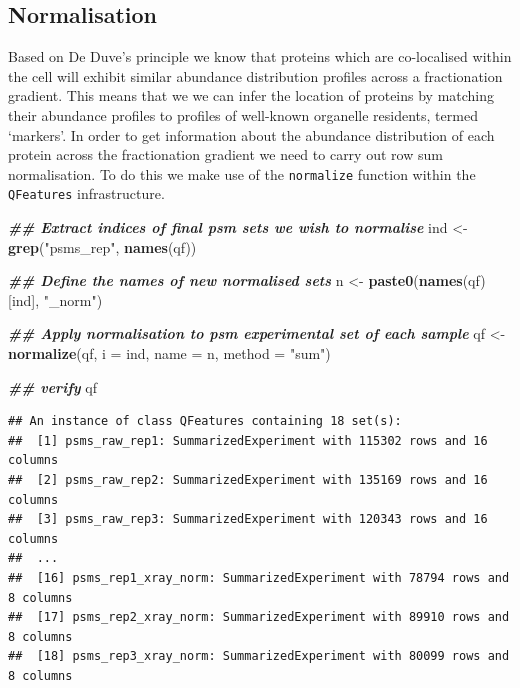 \documentclass[9pt,a4paper,]{extarticle}
\newenvironment{Shaded}{\begin{snugshade}}{\end{snugshade}}
\newcommand{\AttributeTok}[1]{\textcolor[rgb]{0.13,0.29,0.53}{#1}}
\newcommand{\DocumentationTok}[1]{\textcolor[rgb]{0.56,0.35,0.01}{\textbf{\textit{#1}}}}
\newcommand{\FunctionTok}[1]{\textcolor[rgb]{0.13,0.29,0.53}{\textbf{#1}}}
\newcommand{\NormalTok}[1]{#1}
\newcommand{\OtherTok}[1]{\textcolor[rgb]{0.56,0.35,0.01}{#1}}
\newcommand{\StringTok}[1]{\textcolor[rgb]{0.31,0.60,0.02}{#1}}
\begin{document}
\subsection{Normalisation}\label{normalisation}

Based on De Duve's principle \citep{deDuve1964} we know that proteins which are
co-localised within the cell will exhibit similar abundance distribution profiles
across a fractionation gradient. This means that we we can infer the location of
proteins by matching their abundance profiles to profiles of well-known organelle
residents, termed `markers'. In order to get information about the abundance
distribution of each protein across the fractionation gradient we need to carry
out row sum normalisation. To do this we make use of the \texttt{normalize} function
within the \texttt{QFeatures} infrastructure.

\begin{Shaded}
\begin{Highlighting}[]
\DocumentationTok{\#\# Extract indices of final psm sets we wish to normalise}
\NormalTok{ind }\OtherTok{\textless{}{-}} \FunctionTok{grep}\NormalTok{(}\StringTok{"psms\_rep"}\NormalTok{, }\FunctionTok{names}\NormalTok{(qf))}

\DocumentationTok{\#\# Define the names of new normalised sets}
\NormalTok{n }\OtherTok{\textless{}{-}} \FunctionTok{paste0}\NormalTok{(}\FunctionTok{names}\NormalTok{(qf)[ind], }\StringTok{"\_norm"}\NormalTok{)}

\DocumentationTok{\#\# Apply normalisation to psm experimental set of each sample}
\NormalTok{qf }\OtherTok{\textless{}{-}} \FunctionTok{normalize}\NormalTok{(qf, }
                \AttributeTok{i =}\NormalTok{ ind, }
                \AttributeTok{name =}\NormalTok{ n, }
                \AttributeTok{method =} \StringTok{"sum"}\NormalTok{)}

\DocumentationTok{\#\# verify}
\NormalTok{qf}
\end{Highlighting}
\end{Shaded}

\begin{verbatim}
## An instance of class QFeatures containing 18 set(s):
##  [1] psms_raw_rep1: SummarizedExperiment with 115302 rows and 16 columns 
##  [2] psms_raw_rep2: SummarizedExperiment with 135169 rows and 16 columns 
##  [3] psms_raw_rep3: SummarizedExperiment with 120343 rows and 16 columns 
##  ...
##  [16] psms_rep1_xray_norm: SummarizedExperiment with 78794 rows and 8 columns 
##  [17] psms_rep2_xray_norm: SummarizedExperiment with 89910 rows and 8 columns 
##  [18] psms_rep3_xray_norm: SummarizedExperiment with 80099 rows and 8 columns
\end{verbatim}
\end{document}
